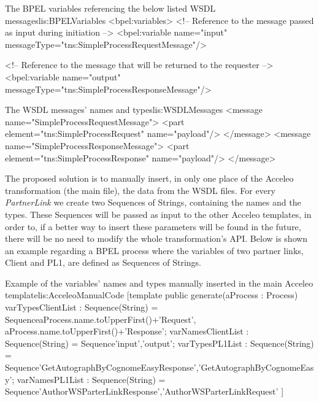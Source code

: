 \begin{center}
  \begin{minipage}{1\textwidth}
    \begin{workflow-code}{The BPEL variables referencing the below listed WSDL messages}{lis:BPELVariables}
<bpel:variables>
     <!-- Reference to the message passed as input during initiation -->
        <bpel:variable name="input"
                  messageType="tns:SimpleProcessRequestMessage"/>
                  
     <!-- Reference to the message that will be returned to the requester -->
        <bpel:variable name="output"
                  messageType="tns:SimpleProcessResponseMessage"/>
    \end{workflow-code}
  \end{minipage}
  \hfill
\begin{minipage}{1\textwidth}
    \begin{workflow-code}{The WSDL messages' names and types}{lis:WSDLMessages}
    <message name="SimpleProcessRequestMessage">
        <part element="tns:SimpleProcessRequest" name="payload"/>
    </message>
    <message name="SimpleProcessResponseMessage">
        <part element="tns:SimpleProcessResponse" name="payload"/>
    </message>	
    \end{workflow-code}
  \end{minipage}
\end{center}

The proposed solution is to manually insert, in only one place of the Acceleo transformation (the main file), the data from the WSDL files. For every \textit{PartnerLink} we create two Sequences of Strings, containing the names and the types. These Sequences will be passed as input to the other Acceleo templates, in order to, if a better way to insert these parameters will be found in the future, there will be no need to modify the whole transformation's API. Below is shown an example regarding a BPEL process where the variables of two partner links, Client and PL1, are defined as Sequences of Strings.

\begin{center}
  \begin{minipage}{1\textwidth}
    \begin{java-code}{Example of the variables' names and types manually inserted in the main Acceleo template}{lis:AcceleoManualCode}
[template public generate(aProcess : Process) {	
	varTypesClientList : Sequence(String) = Sequence{aProcess.name.toUpperFirst()+'Request', aProcess.name.toUpperFirst()+'Response'};
	varNamesClientList : Sequence(String) = Sequence{'input','output'};
	varTypesPL1List : Sequence(String) = Sequence{'GetAutographByCognomeEasyResponse','GetAutographByCognomeEasy'};
	varNamesPL1List : Sequence(String) = Sequence{'AuthorWSParterLinkResponse','AuthorWSParterLinkRequest'}
	}]	
    \end{java-code}
  \end{minipage}
\end{center}

